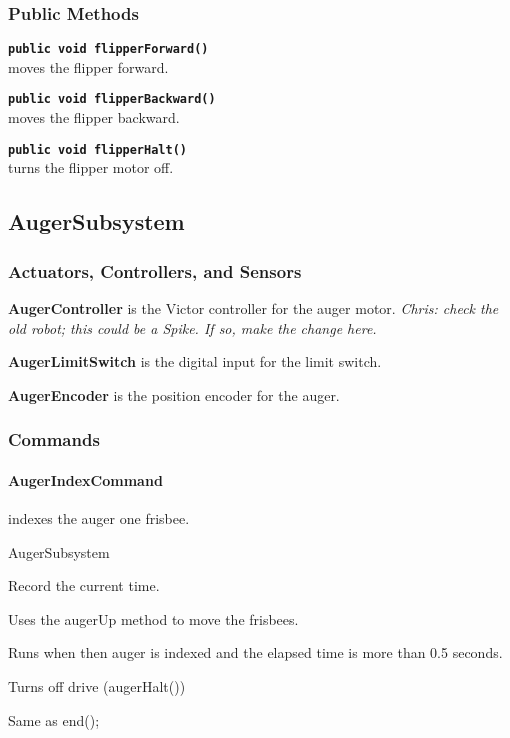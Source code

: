 \documentclass[]{article}
\begin{document}
\subsubsection{Public Methods}

\noindent \texttt{\textbf{public void flipperForward()}} \\
moves the flipper forward.

\noindent \texttt{\textbf{public void flipperBackward()}} \\
moves the flipper backward.

\noindent \texttt{\textbf{public void flipperHalt()}} \\
turns the flipper motor off.


\subsection{AugerSubsystem}

\subsubsection{Actuators, Controllers, and Sensors}

\textbf{AugerController} is the Victor controller for the auger motor. \textit{Chris: check the old robot; this could be a Spike. If so, make the change here.}

\textbf{AugerLimitSwitch} is the digital input for the limit switch.

\textbf{AugerEncoder} is the position encoder for the auger.

\subsubsection{Commands}

\paragraph{AugerIndexCommand} indexes the auger one frisbee.
\begin{description}[topsep=0ex]
\item[requires] AugerSubsystem
\item[initialization] Record the current time.
\item[execute] Uses the augerUp method to move the frisbees.
\item[isDone] Runs when then auger is indexed and the elapsed time is more than 0.5 seconds.
\item[end] Turns off drive (augerHalt())
\item[interrupted] Same as end();
\end{description}
\end{document}
